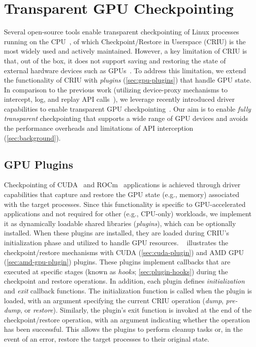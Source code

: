 
\section{Transparent GPU Checkpointing}\label{sec:design}%
Several open-source tools enable transparent checkpointing of Linux processes running on the CPU~\cite{hhargrove2006berkeley,ansel2009dmtcp,criu}, of which Checkpoint/Restore in Userspace (CRIU) is the most widely used and actively maintained. However, a key limitation of CRIU is that, out of the box, it does not support saving and restoring the state of external hardware devices such as GPUs~\cite{shukla2022singularity,eiling2022cricket}. To address this limitation, we extend the functionality of CRIU with \textit{plugins} (\autoref{sec:gpu-plugins}) that handle GPU state. In comparison to the previous work (utilizing device-proxy mechanisms to intercept, log, and replay API calls~\cite{eiling2022cricket,eiling2023cricket,shukla2022singularity,gupta2024just}), we leverage recently introduced driver capabilities to enable transparent GPU checkpointing~\cite{bhardwaj2021drm,gurfinkel2024checkpointing}. Our aim is to enable \textit{fully transparent} checkpointing that supports a wide range of GPU devices and avoids the performance overheads and limitations of API interception (\autoref{sec:background}).

\subsection{GPU Plugins}\label{sec:gpu-plugins}
%
Checkpointing of CUDA~\cite{gurfinkel2024checkpointing} and ROCm~\cite{bhardwaj2021fast} applications is achieved through driver capabilities that capture and restore the GPU state (e.g., memory) associated with the target processes. Since this functionality is specific to GPU-accelerated applications and not required for other (e.g., CPU-only) workloads, we implement it as dynamically loadable shared libraries (\textit{plugins}), which can be optionally installed. When these plugins are installed, they are loaded during CRIU's initialization phase and utilized to handle GPU resources. ~ illustrates the checkpoint/restore mechanisms with CUDA (\autoref{sec:cuda-plugin}) and AMD GPU (\autoref{sec:amd-gpu-plugin}) plugins. These plugins implement callbacks that are executed at specific stages (known as \textit{hooks}; \autoref{sec:plugin-hooks}) during the checkpoint and restore operations. In addition, each plugin defines \textit{initialization} and \textit{exit} callback functions. The initialization function is called when the plugin is loaded, with an argument specifying the current CRIU operation (\textit{dump}, \textit{pre-dump}, or \textit{restore}). Similarly, the plugin's exit function is invoked at the end of the checkpoint/restore operation, with an argument indicating whether the operation has been successful. This allows the plugins to perform cleanup tasks or, in the event of an error, restore the target processes to their original state.

